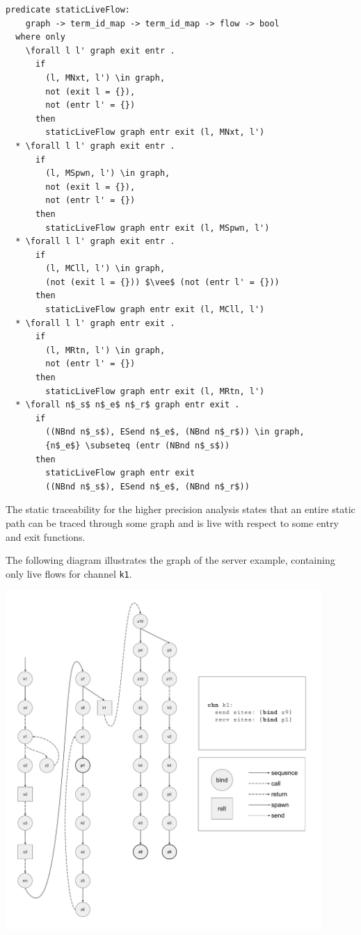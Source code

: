 \documentclass[letterpaper, 11pt]{extarticle}
\begin{document}
\begin{lstlisting}[language=logic, mathescape]
  predicate staticLiveFlow:
    graph -> term_id_map -> term_id_map -> flow -> bool
  where only
    \forall l l' graph exit entr . 
      if
        (l, MNxt, l') \in graph,
        not (exit l = {}),
        not (entr l' = {})
      then
        staticLiveFlow graph entr exit (l, MNxt, l')
  * \forall l l' graph exit entr .
      if
        (l, MSpwn, l') \in graph, 
        not (exit l = {}),
        not (entr l' = {})
      then
        staticLiveFlow graph entr exit (l, MSpwn, l')
  * \forall l l' graph exit entr .
      if
        (l, MCll, l') \in graph,
        (not (exit l = {})) $\vee$ (not (entr l' = {}))
      then
        staticLiveFlow graph entr exit (l, MCll, l')
  * \forall l l' graph entr exit .
      if
        (l, MRtn, l') \in graph,
        not (entr l' = {})
      then
        staticLiveFlow graph entr exit (l, MRtn, l')
  * \forall n$_s$ n$_e$ n$_r$ graph entr exit .
      if
        ((NBnd n$_s$), ESend n$_e$, (NBnd n$_r$)) \in graph, 
        {n$_e$} \subseteq (entr (NBnd n$_s$))
      then
        staticLiveFlow graph entr exit
        ((NBnd n$_s$), ESend n$_e$, (NBnd n$_r$))
\end{lstlisting}

The static traceability for the higher precision analysis states
that an entire static path can be traced through some graph and
is live with respect to some entry and exit functions.

The following diagram illustrates the graph of the server example,
containing only live flows for channel \lstinline{k1}. \

\includegraphics[width=0.9\textwidth]{cml-graph-k1.pdf}
\end{document}
